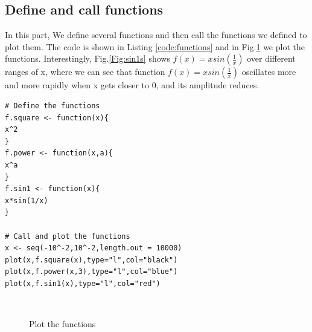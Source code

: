\documentclass[conference,onecolumn]{IEEEtran}
\begin{document}
\subsection{Define and call functions}

In this part, We define several functions and then call the functions we defined to plot them. The code is shown in Listing \ref{code:functions} and in Fig.\ref{Fig:funcs} we plot the functions. Interestingly, Fig.\ref{Fig:sin1s} shows $f(x)=xsin(\frac{1}{x})$ over different ranges of x, where we can see that function $f(x)=xsin(\frac{1}{x})$ oscillates more and more rapidly when x gets closer to 0, and its amplitude reduces.

\begin{lstlisting}[caption={Define and call functions},label={code:functions}]
# Define the functions
f.square <- function(x){
x^2
}
f.power <- function(x,a){
x^a
}
f.sin1 <- function(x){
x*sin(1/x)
}

# Call and plot the functions
x <- seq(-10^-2,10^-2,length.out = 10000)
plot(x,f.square(x),type="l",col="black")
plot(x,f.power(x,3),type="l",col="blue")
plot(x,f.sin1(x),type="l",col="red")
\end{lstlisting}

\begin{figure}[htbp]
	\centering
	\ 
	\
	\   
	\caption{Plot the functions}
	\label{Fig:funcs}
\end{figure}
\end{document}
